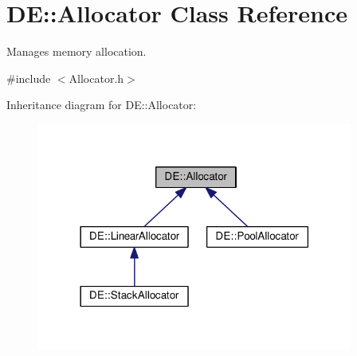 \hypertarget{classDE_1_1Allocator}{}\section{DE\+:\+:Allocator Class Reference}
\label{classDE_1_1Allocator}


Manages memory allocation.  




{\ttfamily \#include $<$Allocator.\+h$>$}



Inheritance diagram for DE\+:\+:Allocator\+:
\nopagebreak
\begin{figure}[H]
\begin{center}
\leavevmode
\includegraphics[width=294pt]{classDE_1_1Allocator__inherit__graph}
\end{center}
\end{figure}
